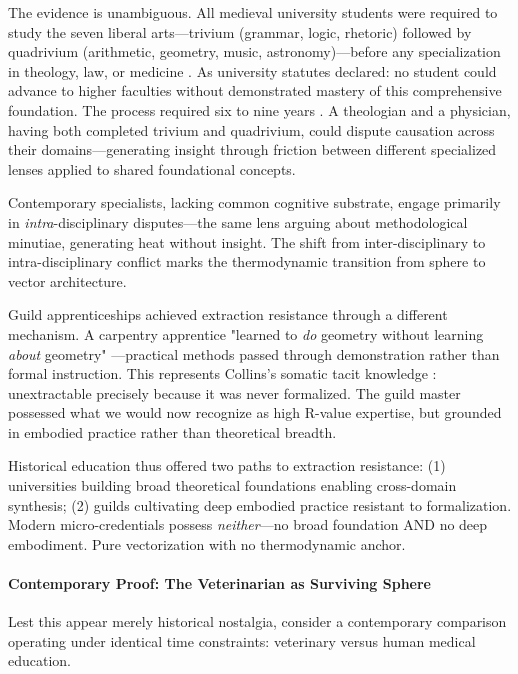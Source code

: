 The evidence is unambiguous. All medieval university students were required to study the seven liberal arts—trivium (grammar, logic, rhetoric) followed by quadrivium (arithmetic, geometry, music, astronomy)—before any specialization in theology, law, or medicine \citep{wikipedia_medieval_university, history_hit_medieval}. As university statutes declared: no student could advance to higher faculties without demonstrated mastery of this comprehensive foundation. The process required six to nine years \citep{history_hit_medieval}. A theologian and a physician, having both completed trivium and quadrivium, could dispute causation across their domains—generating insight through friction between different specialized lenses applied to shared foundational concepts.

Contemporary specialists, lacking common cognitive substrate, engage primarily in \textit{intra}-disciplinary disputes—the same lens arguing about methodological minutiae, generating heat without insight. The shift from inter-disciplinary to intra-disciplinary conflict marks the thermodynamic transition from sphere to vector architecture.

Guild apprenticeships achieved extraction resistance through a different mechanism. A carpentry apprentice "learned to \textit{do} geometry without learning \textit{about} geometry" \citep{medieval_buildings_carpenters}—practical methods passed through demonstration rather than formal instruction. This represents Collins's somatic tacit knowledge \citep{collins2010}: unextractable precisely because it was never formalized. The guild master possessed what we would now recognize as high R-value expertise, but grounded in embodied practice rather than theoretical breadth.

Historical education thus offered two paths to extraction resistance: (1) universities building broad theoretical foundations enabling cross-domain synthesis; (2) guilds cultivating deep embodied practice resistant to formalization. Modern micro-credentials possess \textit{neither}—no broad foundation AND no deep embodiment. Pure vectorization with no thermodynamic anchor.

\paragraph{Contemporary Proof: The Veterinarian as Surviving Sphere}

Lest this appear merely historical nostalgia, consider a contemporary comparison operating under identical time constraints: veterinary versus human medical education.

